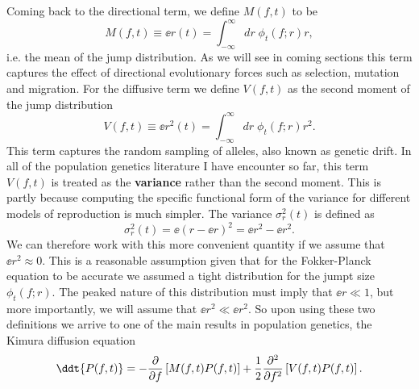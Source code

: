 Coming back to the directional term, we define $M(f, t)$ to be
\begin{equation}
  M(f, t) \equiv \ee{r(t)} = \int_{-\infty}^{\infty} dr \; \phi_t(f; r) r,
\end{equation}
i.e. the mean of the jump distribution. As we will see in coming sections this
term captures the effect of directional evolutionary forces such as selection,
mutation and migration. For the diffusive term we define $V(f, t)$ as the second
moment of the jump distribution
\begin{equation}
  V(f, t) \equiv \ee{r^2(t)} = \int_{-\infty}^{\infty} dr \; \phi_t(f; r) r^2.
\end{equation}
This term captures the random sampling of alleles, also known as genetic drift.
In all of the population genetics literature I have encounter so far, this term
$V(f, t)$ is treated as the \textbf{variance} rather than the second moment.
This is partly because computing the specific functional form of the variance
for different models of reproduction is much simpler. The variance
$\sigma_r^2(t)$ is defined as
\begin{equation}
  \sigma_r^2(t) = \ee{\left( r - \ee{r} \right)^2} = \ee{r^2} - \ee{r}^2.
\end{equation}
We can therefore work with this more convenient quantity if we assume that
$\ee{r}^2 \approx 0$. This is a reasonable assumption given that for the
Fokker-Planck equation to be accurate we assumed a tight distribution for the
jumpt size $\phi_t(f; r)$. The peaked nature of this distribution must imply
that $\ee{r} \ll 1$, but more importantly, we will assume that
$\ee{r}^2 \ll \ee{r^2}$. So upon using these two definitions we arrive to one
of the main results in population genetics, the Kimura diffusion equation
\begin{equation}
  \ddt{P(f, t)} = - {\partial \over \partial f}
  \left[
  M(f, t) P(f, t)
  \right] +
  {1 \over 2}{\partial^2 \over \partial f^2}
  \left[
  V(f, t) P(f, t)
  \right].
  \label{eq_kimura_diffusion}
\end{equation}
